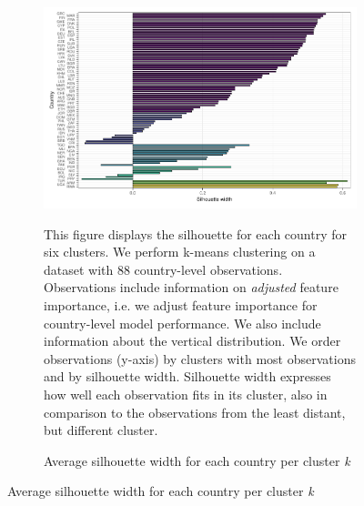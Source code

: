  \begin{figure}[ht!]\ContinuedFloat
   \centering
   \begin{subfigure}[b]{\textwidth}
   \centering
   \includegraphics{Figures_Appendix/Figure_Silhouette_Clusters_2.pdf}
   \caption{Average silhouette width for each country per cluster \textit{k}} \label{fig:G4_silhouette_2}
   \begin{subcaption2}
     This figure displays the silhouette for each country for six clusters. We perform k-means clustering on a dataset with 88 country-level observations. Observations include information on \textit{adjusted} feature importance, i.e. we adjust feature importance for country-level model performance. We also include information about the vertical distribution. We order observations (y-axis) by clusters with most observations and by silhouette width. Silhouette width expresses how well each observation fits in its cluster, also in comparison to the observations from the least distant, but different cluster.
   \end{subcaption2}
   \end{subfigure}
 \end{figure}
 \clearpage

